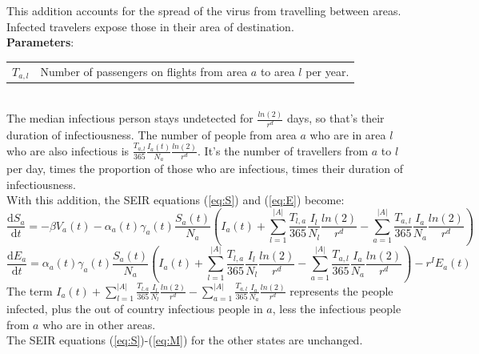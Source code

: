 \documentclass{article}
\begin{document}
This addition accounts for the spread of the virus from travelling between areas. Infected travelers expose those in their area of destination. \\
\textbf{Parameters}:\\
\begin{tabular}{rl}
$T_{a,l}$ & Number of passengers on flights from area $a$ to area $l$ per year.\\%
\end{tabular}\\
The median infectious person stays undetected for $\frac{ln(2)}{r^d}$ days, so that's their duration of infectiousness. 
The number of people from area $a$ who are in area $l$ who are also infectious is $\frac{T_{a,l}}{365}\frac{I_a(t)}{N_a}\frac{ln(2)}{r^d}$. It's the number of travellers from $a$ to $l$ per day, times the proportion of those who are infectious, times their duration of infectiousness.\\
With this addition, the SEIR equations (\ref{eq:S}) and (\ref{eq:E}) become:
\begin{equation}
    \frac{\text{d}S_a}{\text{d}t}= -\beta V_a(t) - \alpha_a(t) \gamma_a(t)\frac{S_a(t)}{N_a}\left(I_a(t) +  \sum\limits_{l=1}^{|A|} \frac{T_{l,a}}{365}\frac{I_l}{N_l}\frac{ln(2)}{r^d} -   \sum\limits_{a=1}^{|A|} \frac{T_{a,l}}{365}\frac{I_a}{N_a}\frac{ln(2)}{r^d}     \right)
\end{equation}
\begin{equation}
        \frac{\text{d}E_a}{\text{d}t} = \alpha_a(t) \gamma_a(t)\frac{S_a(t)}{N_a}\left(I_a(t) +  \sum\limits_{l=1}^{|A|} \frac{T_{l,a}}{365}\frac{I_l}{N_l}\frac{ln(2)}{r^d} -   \sum\limits_{a=1}^{|A|} \frac{T_{a,l}}{365}\frac{I_a}{N_a}\frac{ln(2)}{r^d}    \right) -r^IE_a(t)
\end{equation}
The term $I_a(t) +  \sum\limits_{l=1}^{|A|} \frac{T_{l,a}}{365}\frac{I_l}{N_l}\frac{ln(2)}{r^d} -   \sum\limits_{a=1}^{|A|} \frac{T_{a,l}}{365}\frac{I_a}{N_a}\frac{ln(2)}{r^d}$ represents the people infected, plus the out of country infectious people in $a$, less the infectious people from $a$ who are in other areas.\\
The SEIR equations (\ref{eq:S})-(\ref{eq:M}) for the other states are unchanged.
\end{document}
